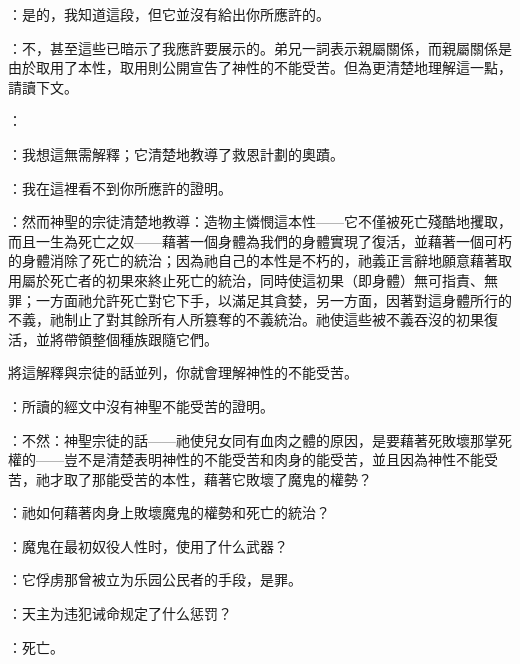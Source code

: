 ：是的，我知道這段，但它並沒有給出你所應許的。\par

：不，甚至這些已暗示了我應許要展示的。弟兄一詞表示親屬關係，而親屬關係是由於取用了本性，取用則公開宣告了神性的不能受苦。但為更清楚地理解這一點，請讀下文。\par

：\par

：我想這無需解釋；它清楚地教導了救恩計劃的奧蹟。\par

：我在這裡看不到你所應許的證明。\par

：然而神聖的宗徒清楚地教導：造物主憐憫這本性——它不僅被死亡殘酷地攫取，而且一生為死亡之奴——藉著一個身體為我們的身體實現了復活，並藉著一個可朽的身體消除了死亡的統治；因為祂自己的本性是不朽的，祂義正言辭地願意藉著取用屬於死亡者的初果來終止死亡的統治，同時使這初果（即身體）無可指責、無罪；一方面祂允許死亡對它下手，以滿足其貪婪，另一方面，因著對這身體所行的不義，祂制止了對其餘所有人所篡奪的不義統治。祂使這些被不義吞沒的初果復活，並將帶領整個種族跟隨它們。\par

將這解釋與宗徒的話並列，你就會理解神性的不能受苦。\par

：所讀的經文中沒有神聖不能受苦的證明。\par

：不然：神聖宗徒的話——祂使兒女同有血肉之體的原因，是要藉著死敗壞那掌死權的——豈不是清楚表明神性的不能受苦和肉身的能受苦，並且因為神性不能受苦，祂才取了那能受苦的本性，藉著它敗壞了魔鬼的權勢？\par

：祂如何藉著肉身上敗壞魔鬼的權勢和死亡的統治？\par

：魔鬼在最初奴役人性时，使用了什么武器？\par

：它俘虏那曾被立为乐园公民者的手段，是罪。\par

：天主为违犯诫命规定了什么惩罚？\par

：死亡。\par

